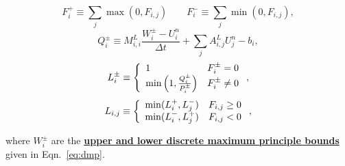 \begin{equation}\label{eq:P_defs}
   F_i^+ \equiv \sum\limits_j\max(0,F_{i,j}) \qquad
   F_i^- \equiv \sum\limits_j\min(0,F_{i,j}),
\end{equation}
\begin{equation}\label{eq:Q_defs}
      Q_i^\pm \equiv M_{i,i}^L\frac{W_i^\pm-U_i^n}{\Delta t}
      + \sum\limits_j A_{i,j}^L U_j^n - b_i,
\end{equation}
\begin{equation}\label{eq:R_defs}
   L_i^\pm \equiv\left\{
      \begin{array}{l l}
         1                                          & F_i^\pm = 0\\
         \min\left(1,\frac{Q_i^\pm}{P_i^\pm}\right) & F_i^\pm \ne 0
      \end{array}
      \right.,
\end{equation}
\begin{equation}\label{eq:L_defs}
   L_{i,j} \equiv\left\{
      \begin{array}{l l}
         \min(L_i^+,L_j^-) & F_{i,j} \geq 0\\
         \min(L_i^-,L_j^+) & F_{i,j} < 0
      \end{array}
      \right.,
\end{equation}

where $W_i^\pm$ are the \underline{\bf upper and lower discrete maximum principle bounds}
given in Eqn.~\ref{eq:dmp}.

